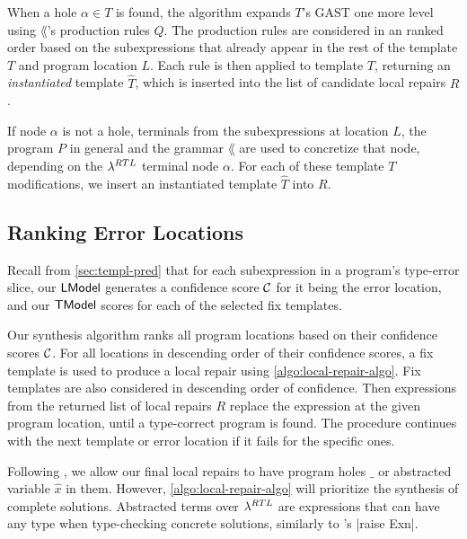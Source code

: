 When a hole $\alpha \in T$ is found, the algorithm expands $T$'s GAST one more
level using $\lang$'s production rules $Q$. The production rules are considered
in an ranked order based on the subexpressions that already appear in the rest
of the template $T$ and program location $L$. Each rule is then applied to
template $T$, returning an \emph{instantiated} template $\hat{T}$, which is
inserted into the list of candidate local repairs $R$.

If node $\alpha$ is not a hole, terminals from the subexpressions at location
$L$, the program $P$ in general and the grammar $\lang$ are used to concretize
that node, depending on the $\lambda^{RTL}$ terminal node $\alpha$. For each of
these template $T$ modifications, we insert an instantiated template $\hat{T}$
into $R$.


\subsection{Ranking Error Locations}
\label{sec:synthesis:location-rank}

Recall from \autoref{sec:templ-pred} that for each subexpression in a program's
type-error slice, our $\mathsf{LModel}$ generates a confidence score $\mathcal{C}$ for it being
the error location, and our $\mathsf{TModel}$ scores for each of the selected fix
templates.

Our synthesis algorithm ranks all program locations based on their confidence
scores $\mathcal{C}$. For all locations in descending order of their confidence
scores, a fix template is used to produce a local repair using
\autoref{algo:local-repair-algo}. Fix templates are also considered in
descending order of confidence. Then expressions from the returned list of local
repairs $R$ replace the expression at the given program location, until a
type-correct program is found. The procedure continues with the next template or
error location if it fails for the specific ones.

Following \citep{Lerner2007-dt}, we allow our final local repairs to have
program holes $\_$ or abstracted variable $\hat{x}$ in them. However,
\autoref{algo:local-repair-algo} will prioritize the synthesis of complete
solutions. Abstracted terms over $\lambda^{RTL}$ are expressions that can have any
type when type-checking concrete solutions, \eg similarly to \ocaml's |raise Exn|.


